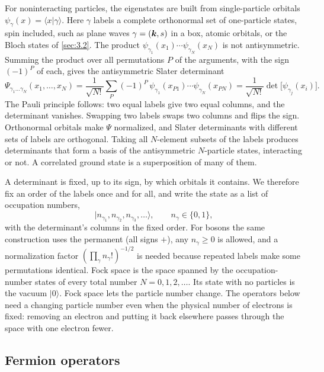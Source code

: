 For noninteracting particles, the eigenstates are built from single-particle orbitals $\psi_\gamma(x) = \langle x|\gamma\rangle$. Here $\gamma$ labels a complete orthonormal set of one-particle states, spin included, such as plane waves $\gamma = (\bm{k}, s)$ in a box, atomic orbitals, or the Bloch states of \cref{sec:3.2}. The product $\psi_{\gamma_1}(x_1)\cdots\psi_{\gamma_N}(x_N)$ is not antisymmetric. Summing the product over all permutations $P$ of the arguments, with the sign $(-1)^P$ of each, gives the antisymmetric Slater determinant
\begin{equation}
  \Psi_{\gamma_1\dots\gamma_N}(x_1,\dots,x_N) = \frac{1}{\sqrt{N!}}\sum_P (-1)^P\,\psi_{\gamma_1}(x_{P1})\cdots\psi_{\gamma_N}(x_{PN})
  = \frac{1}{\sqrt{N!}}\det\bigl[\psi_{\gamma_j}(x_i)\bigr] .
  \label{eq:2.3-slater}
\end{equation}
The Pauli principle follows: two equal labels give two equal columns, and the determinant vanishes. Swapping two labels swaps two columns and flips the sign. Orthonormal orbitals make $\Psi$ normalized, and Slater determinants with different sets of labels are orthogonal. Taking all $N$-element subsets of the labels produces determinants that form a basis of the antisymmetric $N$-particle states, interacting or not. A correlated ground state is a superposition of many of them.

A determinant is fixed, up to its sign, by which orbitals it contains. We therefore fix an order of the labels once and for all, and write the state as a list of occupation numbers,
\begin{equation*}
  |n_{\gamma_1}, n_{\gamma_2}, n_{\gamma_3},\dots\rangle, \qquad n_\gamma \in \{0, 1\},
\end{equation*}
with the determinant's columns in the fixed order. For bosons the same construction uses the permanent (all signs $+$), any $n_\gamma \ge 0$ is allowed, and a normalization factor $(\prod_\gamma n_\gamma!)^{-1/2}$ is needed because repeated labels make some permutations identical. Fock space is the space spanned by the occupation-number states of every total number $N = 0, 1, 2, \dots$. Its state with no particles is the vacuum $|0\rangle$. Fock space lets the particle number change. The operators below need a changing particle number even when the physical number of electrons is fixed: removing an electron and putting it back elsewhere passes through the space with one electron fewer.

\subsection{Fermion operators}

